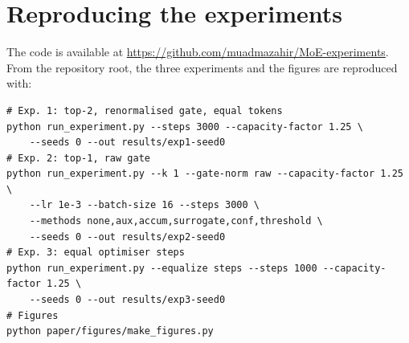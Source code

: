 \documentclass[10pt]{article}
\theoremstyle{definition}
\theoremstyle{remark}
\begin{document}
\section{Reproducing the experiments}
The code is available at \url{https://github.com/muadmazahir/MoE-experiments}. From the repository root, the three experiments and the figures are reproduced with:
\begin{small}
\begin{verbatim}
# Exp. 1: top-2, renormalised gate, equal tokens
python run_experiment.py --steps 3000 --capacity-factor 1.25 \
    --seeds 0 --out results/exp1-seed0
# Exp. 2: top-1, raw gate
python run_experiment.py --k 1 --gate-norm raw --capacity-factor 1.25 \
    --lr 1e-3 --batch-size 16 --steps 3000 \
    --methods none,aux,accum,surrogate,conf,threshold \
    --seeds 0 --out results/exp2-seed0
# Exp. 3: equal optimiser steps
python run_experiment.py --equalize steps --steps 1000 --capacity-factor 1.25 \
    --seeds 0 --out results/exp3-seed0
# Figures
python paper/figures/make_figures.py
\end{verbatim}
\end{small}
\end{document}
